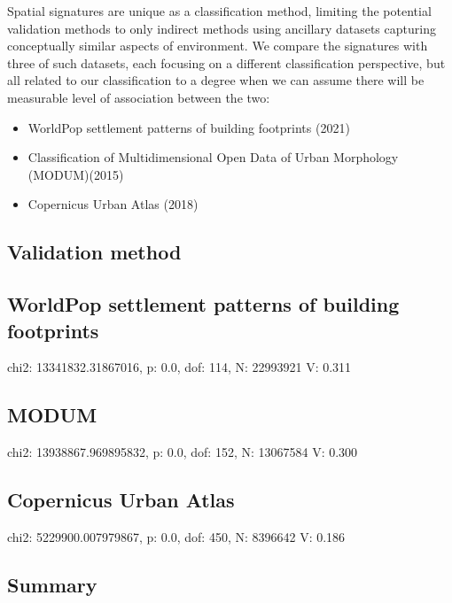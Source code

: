 Spatial signatures are unique as a classification method, limiting the potential
validation methods to only indirect methods using ancillary datasets capturing
conceptually similar aspects of environment. We compare the signatures with three of
such datasets, each focusing on a different classification perspective, but all related
to our classification to a degree when we can assume there will be measurable level of
association between the two:

\begin{itemize}
    \item WorldPop settlement patterns of building footprints (2021)
    \item Classification of Multidimensional Open Data of Urban Morphology (MODUM)(2015)
    \item Copernicus Urban Atlas (2018)
\end{itemize}


\subsection*{Validation method}


\subsection*{WorldPop settlement patterns of building footprints}
    chi2: 13341832.31867016, p: 0.0, dof: 114, N: 22993921
    V: 0.311


\subsection*{MODUM}
    chi2: 13938867.969895832, p: 0.0, dof: 152, N: 13067584
    V: 0.300


\subsection*{Copernicus Urban Atlas}
    chi2: 5229900.007979867, p: 0.0, dof: 450, N: 8396642
    V: 0.186

\subsection*{Summary}
